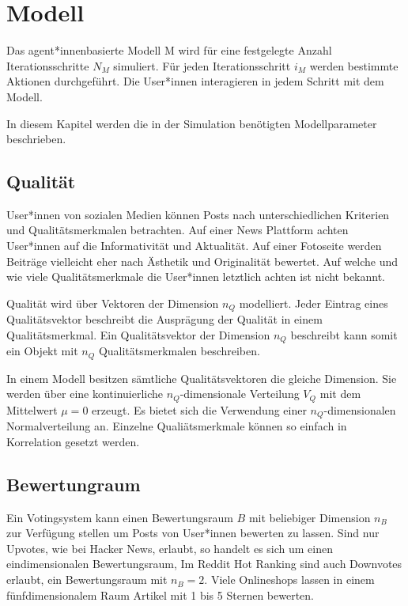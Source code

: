 \chapter{Modell}
\label{chapter:modell}
Das agent*innenbasierte Modell \ac{M} wird für eine festgelegte Anzahl Iterationsschritte $N_M$ simuliert. Für jeden Iterationsschritt $i_M$ werden bestimmte Aktionen durchgeführt. Die User*innen interagieren in jedem Schritt mit dem Modell.

In diesem Kapitel werden die in der Simulation benötigten Modellparameter beschrieben.

\section{Qualität}
User*innen von sozialen Medien können Posts nach unterschiedlichen Kriterien und Qualitätsmerkmalen betrachten. Auf einer News Plattform achten User*innen auf die Informativität und Aktualität. Auf einer Fotoseite werden Beiträge vielleicht eher nach Ästhetik und Originalität bewertet. Auf welche und wie viele Qualitätsmerkmale die User*innen letztlich achten ist nicht bekannt.

Qualität wird über Vektoren der Dimension $n_Q$ modelliert. Jeder Eintrag eines Qualitätsvektor beschreibt die Ausprägung der Qualität in einem Qualitätsmerkmal. Ein Qualitätsvektor der Dimension $n_Q$ beschreibt kann somit ein Objekt mit $n_Q$ Qualitätsmerkmalen beschreiben. 

In einem Modell besitzen sämtliche Qualitätsvektoren die gleiche Dimension. Sie werden über eine kontinuierliche $n_Q$-dimensionale Verteilung $V_Q$ mit dem Mittelwert $\mu = 0$ erzeugt. Es bietet sich die Verwendung einer $n_Q$-dimensionalen Normalverteilung an. Einzelne Qualiätsmerkmale können so einfach in Korrelation gesetzt werden. 

\section{Bewertungraum}

Ein Votingsystem kann einen Bewertungsraum $B$ mit beliebiger Dimension $n_B$ zur Verfügung stellen um Posts von User*innen bewerten zu lassen. Sind nur Upvotes, wie bei Hacker News, erlaubt, so handelt es sich um einen eindimensionalen Bewertungsraum, Im Reddit Hot Ranking sind auch Downvotes erlaubt, ein Bewertungsraum mit $n_B = 2$. Viele Onlineshops lassen in einem fünfdimensionalem Raum Artikel mit 1 bis 5 Sternen bewerten.


